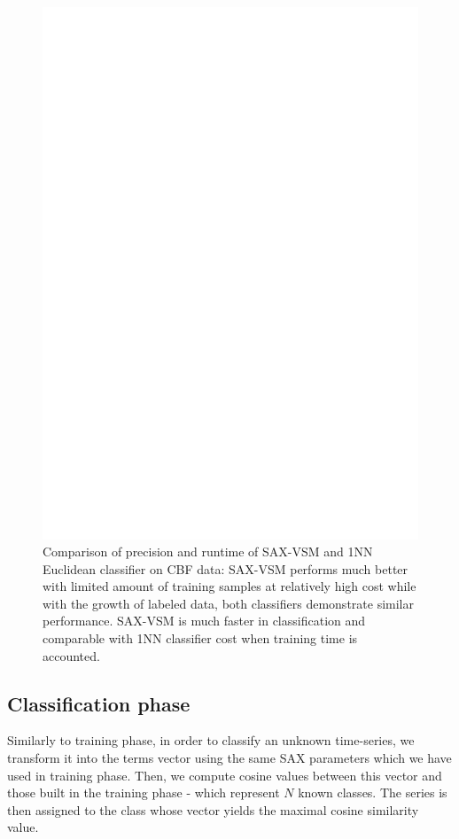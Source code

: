 \documentclass{llncs}
\begin{document}
\begin{figure}[tbp]
   \centering
   \includegraphics[width=125mm]{figures/precision-runtime.ps}
   \caption{Comparison of precision and runtime of SAX-VSM and 1NN Euclidean classifier on
CBF data: SAX-VSM performs much better with limited amount of training samples at relatively high
cost while with the growth of labeled data, both classifiers demonstrate similar performance.
SAX-VSM is much faster in classification and comparable with 1NN classifier cost when training time
is accounted.}
   \label{fig:precision-runtime}
\end{figure}

\subsection{Classification phase}
Similarly to training phase, in order to classify an unknown time-series, we transform it into the
terms vector using the same SAX parameters which we have used in training phase. Then, we compute
cosine values between this vector and those built in the training phase - which represent $N$ known
classes. The series is then assigned to the class whose vector yields the maximal cosine similarity
value.
\end{document}
